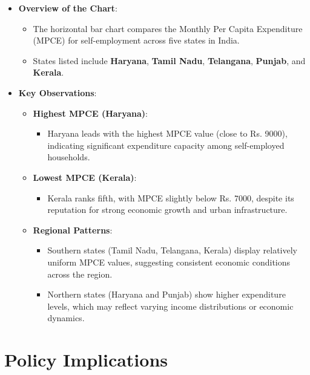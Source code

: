 \documentclass{article}
\begin{document}
\begin{itemize}
	\item \textbf{Overview of the Chart}:
	\begin{itemize}
		\item The horizontal bar chart compares the Monthly Per Capita Expenditure (MPCE) for self-employment across five states in India.
		\item States listed include \textbf{Haryana}, \textbf{Tamil Nadu}, \textbf{Telangana}, \textbf{Punjab}, and \textbf{Kerala}.
	\end{itemize}
	\item \textbf{Key Observations}:
	\begin{itemize}
		\item \textbf{Highest MPCE (Haryana)}:
		\begin{itemize}
			\item Haryana leads with the highest MPCE value (close to Rs. 9000), indicating significant expenditure capacity among self-employed households.
		\end{itemize}
		\item \textbf{Lowest MPCE (Kerala)}:
		\begin{itemize}
			\item Kerala ranks fifth, with MPCE slightly below Rs. 7000, despite its reputation for strong economic growth and urban infrastructure.
		\end{itemize}
		\item \textbf{Regional Patterns}:
		\begin{itemize}
			\item Southern states (Tamil Nadu, Telangana, Kerala) display relatively uniform MPCE values, suggesting consistent economic conditions across the region.
			\item Northern states (Haryana and Punjab) show higher expenditure levels, which may reflect varying income distributions or economic dynamics.
		\end{itemize}
	\end{itemize}
\end{itemize}

\section*{Policy Implications}
\end{document}
